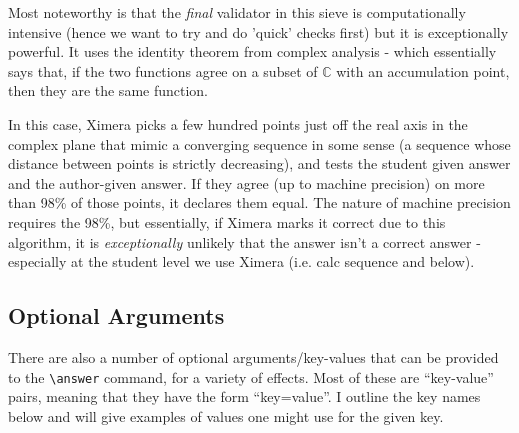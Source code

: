 \documentclass{ximera}
\begin{document}
        Most noteworthy is that the \textit{final} validator in this sieve is computationally intensive (hence we want to try and do 'quick' checks first) but it is exceptionally powerful. It uses the identity theorem from complex analysis - which essentially says that, if the two functions agree on a subset of $\mathbb{C}$ with an accumulation point, then they are the same function.
        
        In this case, Ximera picks a few hundred points just off the real axis in the complex plane that mimic a converging sequence in some sense (a sequence whose distance between points is strictly decreasing), and tests the student given answer and the author-given answer. If they agree (up to machine precision) on more than 98\% of those points, it declares them equal. The nature of machine precision requires the 98\%, but essentially, if Ximera marks it correct due to this algorithm, it is \textit{exceptionally} unlikely that the answer isn't a correct answer - especially at the student level we use Ximera (i.e. calc sequence and below).
        
        


    \subsection*{Optional Arguments}
    
        There are also a number of optional arguments/key-values that can be provided to the \verb|\answer| command, for a variety of effects. Most of these are ``key-value'' pairs, meaning that they have the form ``key=value''. I outline the key names below and will give examples of values one might use for the given key.
\end{document}

